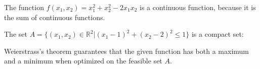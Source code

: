 
 The function $f(x_1,x_2) = x_1^2 +x_2^2 -2x_1 x_2$ is a continuous function, because it is the sum of continuous functions.

\begin{center}
\end{center}

The set $A=\big\{(x_1,x_2) \in \mathbb{R}^2|(x_1-1)^2+(x_2-2)^2 \leq 1 \big\}$ is a compact set:

\begin{center}
\end{center}

Weierstrass's theorem guarantees that the given function has both a
maximum and a minimum when optimized on the feasible set $A$.


